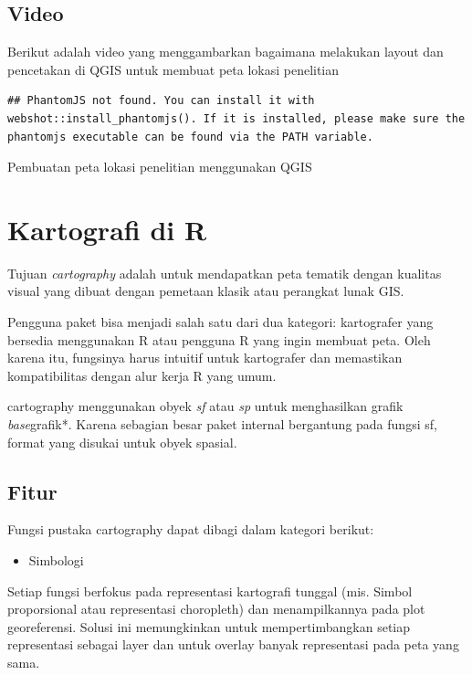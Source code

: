 \documentclass[]{book}
\providecommand{\tightlist}{%
  \setlength{\itemsep}{0pt}\setlength{\parskip}{0pt}}
\begin{document}
\hypertarget{video}{%
\subsection{Video}\label{video}}

Berikut adalah video yang menggambarkan bagaimana melakukan layout dan pencetakan di QGIS untuk membuat peta lokasi penelitian

\begin{verbatim}
## PhantomJS not found. You can install it with webshot::install_phantomjs(). If it is installed, please make sure the phantomjs executable can be found via the PATH variable.
\end{verbatim}

\label{fig:embed11}Pembuatan peta lokasi penelitian menggunakan QGIS

\hypertarget{kartografi-di-r}{%
\section{Kartografi di R}\label{kartografi-di-r}}

Tujuan \emph{cartography} adalah untuk mendapatkan peta tematik dengan kualitas visual yang dibuat dengan pemetaan klasik atau perangkat lunak GIS.

Pengguna paket bisa menjadi salah satu dari dua kategori: kartografer yang bersedia menggunakan R atau pengguna R yang ingin membuat peta. Oleh karena itu, fungsinya harus intuitif untuk kartografer dan memastikan kompatibilitas dengan alur kerja R yang umum.

cartography menggunakan obyek \emph{sf} atau \emph{sp} untuk menghasilkan grafik \emph{base}grafik*. Karena sebagian besar paket internal bergantung pada fungsi sf, format yang disukai untuk obyek spasial.

\hypertarget{fitur}{%
\subsection{Fitur}\label{fitur}}

Fungsi pustaka cartography dapat dibagi dalam kategori berikut:

\begin{itemize}
\tightlist
\item
  Simbologi
\end{itemize}

Setiap fungsi berfokus pada representasi kartografi tunggal (mis. Simbol proporsional atau representasi choropleth) dan menampilkannya pada plot georeferensi. Solusi ini memungkinkan untuk mempertimbangkan setiap representasi sebagai layer dan untuk overlay banyak representasi pada peta yang sama.
\end{document}
